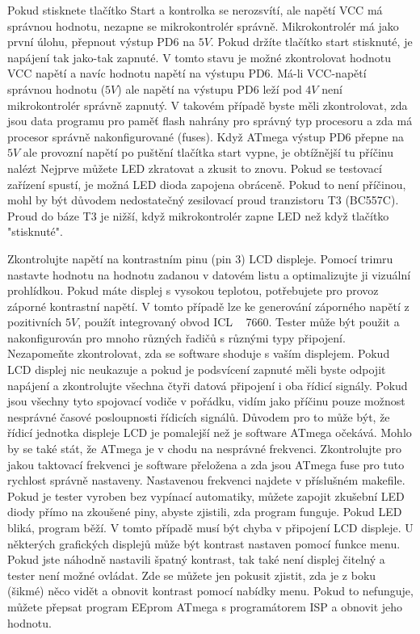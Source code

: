 \begin{description} \setlength{\itemsep}{0em}

\item[Zařízení se nezapne]  
Pokud stisknete tlačítko Start a kontrolka se nerozsvítí, ale napětí VCC má správnou hodnotu,
nezapne se mikrokontrolér správně.
Mikrokontrolér má jako první úlohu, přepnout výstup PD6 na \(5V\).
Pokud držíte tlačítko start stisknuté, je napájení tak jako-tak zapnuté.
V tomto stavu je možné zkontrolovat hodnotu VCC napětí a navíc hodnotu napětí na výstupu PD6.
Má-li VCC-napětí správnou hodnotu (\(5V\)) ale napětí na výstupu PD6 leží pod \(4V\) není
mikrokontrolér správně zapnutý.
V takovém případě byste měli zkontrolovat, zda jsou data programu pro paměť flash nahrány
pro správný typ procesoru a zda má procesor správně nakonfigurované (fuses).
Když ATmega výstup PD6 přepne na \(5V\) ale provozní napětí po puštění tlačítka start vypne,
je obtížnější tu příčinu nalézt Nejprve můžete LED zkratovat a zkusit to znovu.
Pokud se testovací zařízení spustí, je možná LED dioda zapojena obráceně.
Pokud to není příčinou, mohl by být důvodem nedostatečný zesilovací proud tranzistoru T3 (BC557C).
Proud do báze T3 je nižší, když mikrokontrolér zapne LED než když tlačítko "stisknuté".

\item[Na LCD displeji nelze číst] 
Zkontrolujte napětí na kontrastním pinu (pin 3) LCD displeje.
Pomocí trimru nastavte hodnotu na hodnotu zadanou v datovém listu a optimalizujte ji
vizuální prohlídkou.
Pokud máte displej s vysokou teplotou, potřebujete pro provoz záporné kontrastní napětí.
V tomto případě lze ke generování záporného napětí z pozitivních \(5V\), použít integrovaný obvod ICL ~ 7660.
Tester může být použit a nakonfigurován pro mnoho různých řadičů s různými typy připojení.
Nezapomeňte zkontrolovat, zda se software shoduje s vaším displejem.
Pokud LCD displej nic neukazuje a pokud je podsvícení zapnuté
měli byste odpojit napájení a zkontrolujte všechna čtyři datová připojení i oba řídicí signály.
Pokud jsou všechny tyto spojovací vodiče v pořádku, vidím jako příčinu pouze možnost nesprávné
časové posloupnosti řídicích signálů.
Důvodem pro to může být, že řídicí jednotka displeje LCD je pomalejší než je software ATmega očekává.
Mohlo by se také stát, že ATmega je v chodu na nesprávné frekvenci.
Zkontrolujte pro jakou taktovací frekvenci je software přeložena a zda jsou ATmega fuse pro
tuto rychlost správně nastaveny.
Nastavenou frekvenci najdete v příslušném makefile.
Pokud je tester vyroben bez vypínací automatiky, můžete zapojit zkušební LED diody přímo na
zkoušené piny, abyste zjistili, zda program funguje.
Pokud LED bliká, program běží. V tomto případě musí být chyba v připojení LCD displeje.
 U některých grafických displejů může být kontrast nastaven pomocí funkce menu.
Pokud jste náhodně nastavili špatný kontrast, tak také není displej čitelný a tester není možné
ovládat.
Zde se můžete jen pokusit zjistit, zda je z boku (šikmé) něco vidět a obnovit kontrast pomocí
nabídky menu. Pokud to nefunguje, můžete přepsat program EEprom ATmega s programátorem ISP a obnovit jeho hodnotu.


\end{description}
